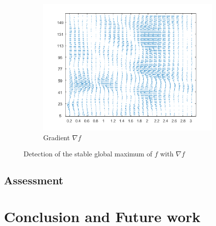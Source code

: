 \documentclass[11pt,a4,twosided,singlespacing,titlepagenumber=on]{scrreprt}
\numberwithin{equation}{chapter} %
\theoremstyle{remark}
\begin{document}
\begin{figure}[H]
\begin{subfigure}[t]{0.49\textwidth}
        \includegraphics[width=1\textwidth]{surf/3}
        \caption{Gradient $\nabla f$}
        \label{vol_mod_sma}
    \end{subfigure}
    \caption{Detection of the stable global maximum of $f$ with $\nabla f$}
    \label{fig:sharpe_ratio_topology}
\end{figure}

\section{Assessment }

\chapter{Conclusion and Future work}
\end{document}
